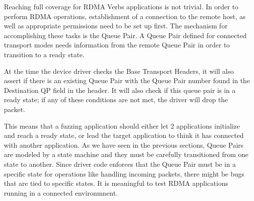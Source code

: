 Reaching full coverage for RDMA Verbs applications is not trivial. In order to perform RDMA operations, establishment of
a connection to the remote host, as well as appropriate permissions need to be set up first. The mechanism for accomplishing
these tasks is the Queue Pair\cite{rdmamanual}. A Queue Pair defined for connected transport modes needs information from
the remote Queue Pair in order to transition to a ready state.

At the time the device driver checks the Base Transport Headers, it will also assert if there is an existing Queue Pair
with the Queue Pair number found in the Destination QP field in the header.
It will also check if this queue pair is in a ready state; if any of these conditions
are not met, the driver will drop the packet.

This means that a fuzzing application should either let 2 applications initialize and reach a ready state,
or lead the target application to think it has connected with another application. As we have seen
in the previous sections, Queue Pairs are modeled by a state machine and they must be carefully transitioned from one
state to another. Since driver code enforces that the Queue Pair must be in a specific state for operations like
handling incoming packets, there might be bugs that are tied to specific states. It is meaningful to test
RDMA applications running in a connected environmnent.
